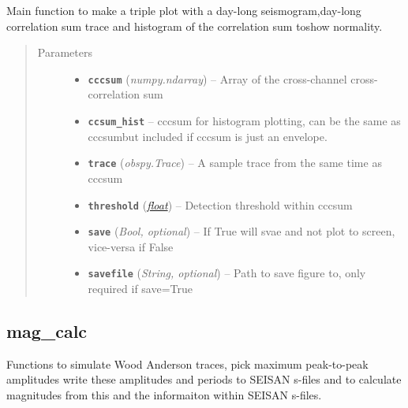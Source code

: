 \documentclass[a4paper,10pt,english]{sphinxmanual}
\begin{document}

\begin{fulllineitems}
\label{submodules/utils.EQcorrscan_plotting:EQcorrscan_plotting.triple_plot}
Main function to make a triple plot with a day-long seismogram,day-long correlation sum trace and histogram of the correlation sum toshow normality.
\begin{quote}\begin{description}
\item[{Parameters}] \leavevmode\begin{itemize}
\item {} 
\textbf{\texttt{cccsum}} (\emph{numpy.ndarray}) -- Array of the cross-channel cross-correlation sum

\item {} 
\textbf{\texttt{ccsum\_hist}} -- cccsum for histogram plotting, can be the same as cccsumbut included if cccsum is just an envelope.

\item {} 
\textbf{\texttt{trace}} (\emph{obspy.Trace}) -- A sample trace from the same time as cccsum

\item {} 
\textbf{\texttt{threshold}} (\href{https://docs.python.org/library/functions.html\#float}{\emph{float}}) -- Detection threshold within cccsum

\item {} 
\textbf{\texttt{save}} (\emph{Bool, optional}) -- If True will svae and not plot to screen, vice-versa if False

\item {} 
\textbf{\texttt{savefile}} (\emph{String, optional}) -- Path to save figure to, only required if save=True

\end{itemize}

\end{description}\end{quote}

\end{fulllineitems}



\subsection{mag\_calc}
\label{submodules/utils.mag_calc:module-mag_calc}\label{submodules/utils.mag_calc::doc}\label{submodules/utils.mag_calc:mag-calc}
Functions to simulate Wood Anderson traces, pick maximum peak-to-peak amplitudes
write these amplitudes and periods to SEISAN s-files and to calculate magnitudes
from this and the informaiton within SEISAN s-files.
\end{document}
